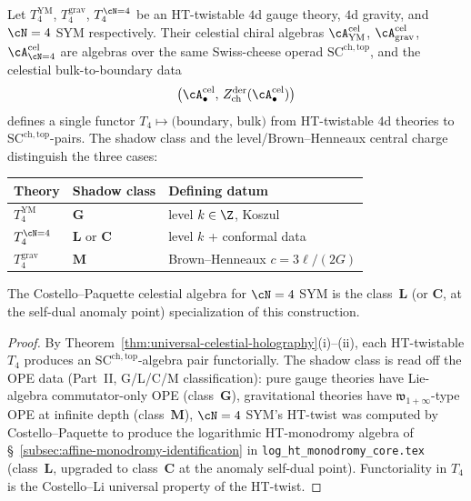 \begin{theorem}[Unification: YM + gravity + $\cN=4$ share a single $\mathrm{SC}^{\mathrm{ch,top}}$ skeleton]
\label{thm:ym-gravity-N4-unification}
Let $T_4^{\mathrm{YM}}$, $T_4^{\mathrm{grav}}$, $T_4^{\cN=4}$ be an
HT-twistable $4$d gauge theory, $4$d gravity, and $\cN=4$ SYM
respectively. Their celestial chiral algebras
$\cA^{\mathrm{cel}}_{\mathrm{YM}}$, $\cA^{\mathrm{cel}}_{\mathrm{grav}}$,
$\cA^{\mathrm{cel}}_{\cN=4}$ are algebras over the same Swiss-cheese
operad $\mathrm{SC}^{\mathrm{ch,top}}$, and the celestial
bulk-to-boundary data
\[
\bigl(\cA^{\mathrm{cel}}_\bullet,\,
 Z^{\mathrm{der}}_{\mathrm{ch}}(\cA^{\mathrm{cel}}_\bullet)\bigr)
\]
defines a single functor
$T_4 \mapsto \bigl(\text{boundary, bulk}\bigr)$ from HT-twistable $4$d
theories to $\mathrm{SC}^{\mathrm{ch,top}}$-pairs. The shadow class
and the level/Brown--Henneaux central charge distinguish the three
cases:
\begin{center}
\begin{tabular}{l|l|l}
Theory & Shadow class & Defining datum \\\hline
$T_4^{\mathrm{YM}}$ & $\mathbf G$ & level $k\in\Z$, Koszul\\
$T_4^{\cN=4}$ & $\mathbf L$ or $\mathbf C$ & level $k$ + conformal data\\
$T_4^{\mathrm{grav}}$ & $\mathbf M$ & Brown--Henneaux $c=3\ell/(2G)$
\end{tabular}
\end{center}
The Costello--Paquette celestial algebra for $\cN=4$ SYM is the
class~$\mathbf L$ (or $\mathbf C$, at the self-dual anomaly point)
specialization of this construction.
\end{theorem}

\begin{proof}
By Theorem~\ref{thm:universal-celestial-holography}(i)--(ii), each
HT-twistable $T_4$ produces an
$\mathrm{SC}^{\mathrm{ch,top}}$-algebra pair functorially. The shadow
class is read off the OPE data (Part~II, G/L/C/M classification):
pure gauge theories have Lie-algebra commutator-only OPE
(class~$\mathbf G$), gravitational theories have
$\mathfrak{w}_{1+\infty}$-type OPE at infinite depth
(class~$\mathbf M$), $\cN=4$ SYM's HT-twist was computed by
Costello--Paquette to produce the logarithmic HT-monodromy algebra
of \S~\ref{subsec:affine-monodromy-identification} in
\texttt{log\_ht\_monodromy\_core.tex} (class~$\mathbf L$, upgraded to
class~$\mathbf C$ at the anomaly self-dual point).
Functoriality in $T_4$ is the Costello--Li universal property of
the HT-twist.
\end{proof}


